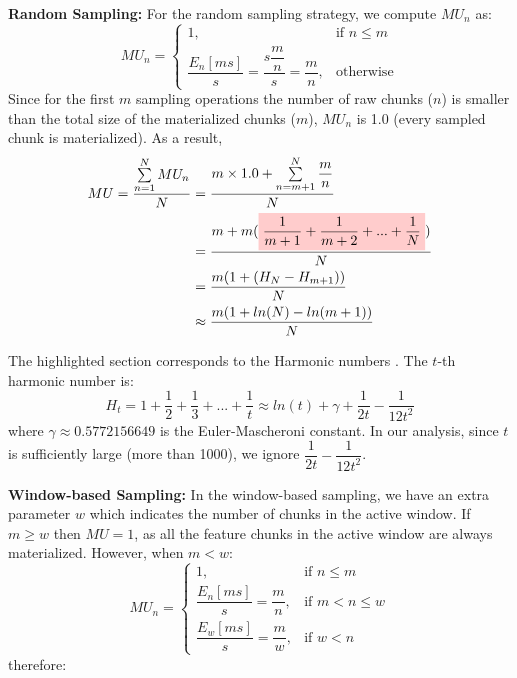 \textbf{Random Sampling:} 
For the random sampling strategy, we compute $MU_n$ as:
\begin{equation*}
MU_n = 
\begin{cases}
    1, 	&\text{if } n \leq m\\
     \dfrac{E_n[ms]}{s} = \dfrac{s\dfrac{m}{n}}{s} = \dfrac{m}{n},   & \text{otherwise}
\end{cases}
\end{equation*}
Since for the first $m$ sampling operations the number of raw chunks ($n$) is smaller than the total size of the materialized chunks ($m$), $MU_n$ is 1.0 (every sampled chunk is materialized).
\newcommand{\highlight}[1]{%
  \colorbox{red!20}{$\displaystyle#1$}}
As a result, 
\begin{equation} \label{formula-uniform}
\begin{aligned}
MU=\dfrac{\sum\limits_{n=1}^N MU_n}{N}
&=\dfrac{m \times 1.0 + \sum\limits_{n = m+1}^{N} \dfrac{m}{n}}{N} \\
&=\dfrac{m  +  m (\highlight{\dfrac{1}{m+1} +\dfrac{1}{m+2}  + ... + \dfrac{1}{N}}) }{N}\\
&=\dfrac{m(1 + (H_N - H_{m+1}))}{N}\\
&\approx \dfrac{m( 1+ln(N) - ln(m+1))}{N}
\end{aligned}
\end{equation}

The highlighted section corresponds to the Harmonic numbers \cite{sun2012arithmetic}.
The $t$-th harmonic number is:
\begin{equation*}
H_t = 1 + \dfrac{1}{2} + \dfrac{1}{3} + ... + \dfrac{1}{t} \approx ln(t) + \gamma + \dfrac{1}{2t} - \dfrac{1}{12t^2}
\end{equation*}
where $\gamma \approx 0.5772156649$ is the Euler-Mascheroni constant.
In our analysis, since $t$ is sufficiently large (more than 1000), we ignore $\dfrac{1}{2t} - \dfrac{1}{12t^2}$.

\textbf{Window-based Sampling:}
In the window-based sampling, we have an extra parameter $w$ which indicates the number of chunks in the active window.
If $m \geq w$ then $MU=1$, as all the feature chunks in the active window are always materialized.
However, when $m < w$:
\begin{equation*}
MU_n = 
\begin{cases}
    1, 	&\text{if } n \leq m\\
     \dfrac{E_n[ms]}{s} = \dfrac{m}{n},   &\text{if } m < n \leq w\\
      \dfrac{E_w[ms]}{s} = \dfrac{m}{w},  &\text{if } w < n
\end{cases}
\end{equation*}
therefore: 

